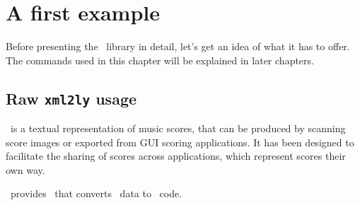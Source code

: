 



\chapter{A first example}

Before presenting the \mf\ library in detail, let's get an idea of what it has to offer. The commands used in this chapter will be explained in later chapters.


\section{Raw {\tt xml2ly} usage}

\mxml\ is a textual representation of music scores, that can be produced by scanning score images or exported from GUI scoring applications. It has been designed to facilitate the sharing of scores across applications, which represent scores their own way.

\mf\ provides \xmlToLy\, that converts \mxml\ data to \lily\ code.

